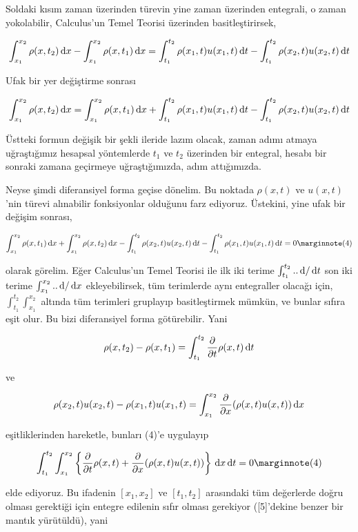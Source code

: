 \documentclass[12pt,fleqn]{article}\usepackage{../../common}
\begin{document}
Soldaki kısım zaman üzerinden türevin yine zaman üzerinden entegrali, o zaman
yokolabilir, Calculus'un Temel Teorisi üzerinden basitleştirirsek,

$$
\int _{x_1}^{x_2} \rho(x,t_2) \,\mathrm{d} x -
\int _{x_1}^{x_2} \rho(x,t_1) \,\mathrm{d} x  = 
\int_{t_1}^{t_2} \rho(x_1,t) u(x_1,t) \,\mathrm{d} t -
\int_{t_1}^{t_2}  \rho(x_2,t) u(x_2,t) \,\mathrm{d} t
$$

Ufak bir yer değiştirme sonrası

$$
\int _{x_1}^{x_2} \rho(x,t_2) \,\mathrm{d} x =
\int _{x_1}^{x_2} \rho(x,t_1) \,\mathrm{d} x  +
\int_{t_1}^{t_2} \rho(x_1,t) u(x_1,t) \,\mathrm{d} t -
\int_{t_1}^{t_2}  \rho(x_2,t) u(x_2,t) \,\mathrm{d} t
$$

Üstteki formun değişik bir şekli ileride lazım olacak, zaman adımı atmaya
uğraştığımız hesapsal yöntemlerde $t_1$ ve $t_2$ üzerinden bir entegral, hesabı
bir sonraki zamana geçirmeye uğraştığımızda, adım attığımızda.

Neyse şimdi diferansiyel forma geçise dönelim. Bu noktada $\rho(x,t)$ ve
$u(x,t)$'nin türevi alınabilir fonksiyonlar olduğunu farz ediyoruz. Üstekini,
yine ufak bir değişim sonrası,

$$
\int _{x_1}^{x_2} \rho(x,t_1) \ud x  +
\int _{x_1}^{x_2} \rho(x,t_2) \ud x -
\int_{t_1}^{t_2}  \rho(x_2,t) u(x_2,t) \ud t -
\int_{t_1}^{t_2} \rho(x_1,t) u(x_1,t) \ud t = 0
\mlabel{4}
$$

olarak görelim. Eğer Calculus'un Temel Teorisi ile ilk iki terime
$\int_{t_1}^{t_2} .. \,\mathrm{d} / \,\mathrm{d} t$ son iki terime $\int_{x_1}^{x_2} .. \,\mathrm{d} / \,\mathrm{d} x$
ekleyebilirsek, tüm terimlerde aynı entegraller olacağı için, 
$\int_{t_1}^{t_2} \int_{x_1}^{x_2} $ altında tüm terimleri gruplayıp
basitleştirmek mümkün, ve bunlar sıfıra eşit olur. Bu bizi diferansiyel
forma götürebilir. Yani

$$
\rho(x,t_2) - \rho(x,t_1) = \int_{t_1}^{t_2}
\frac{\partial }{\partial t} \rho(x,t) \,\mathrm{d} t
$$

ve

$$
\rho(x_2,t)u(x_2,t) - \rho(x_1,t)u(x_1,t) =
\int _{x_1}^{x_2} \frac{\partial }{\partial x} (\rho(x,t)u(x,t)) \,\mathrm{d} x
$$

eşitliklerinden hareketle, bunları (4)'e uygulayıp

$$
\int _{t_1}^{t_2} \int _{x_1}^{x_2}  \left\{
\frac{\partial }{\partial t} \rho(x,t)  +
\frac{\partial }{\partial x} (\rho(x,t)u(x,t))
\right\} \ud x \ud t = 0
\mlabel{4}
$$

elde ediyoruz. Bu ifadenin $[x_1,x_2]$ ve $[t_1,t_2]$ arasındaki tüm değerlerde
doğru olması gerektiği için entegre edilenin sıfır olması gerekiyor ([5]'dekine
benzer bir mantık yürütüldü), yani
\end{document}
